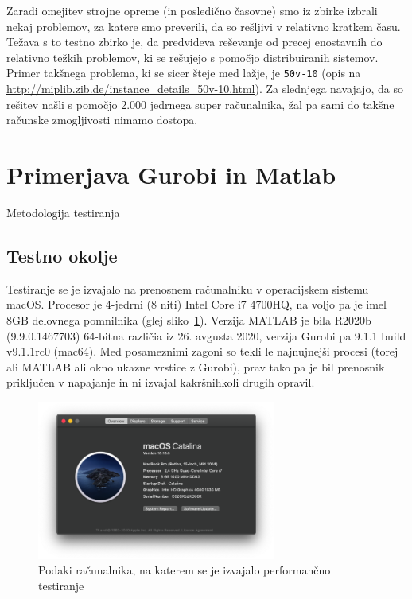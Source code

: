 \documentclass[a4paper,11pt]{article}
\begin{document}
Zaradi omejitev strojne opreme (in posledično časovne) smo iz zbirke izbrali nekaj problemov, za katere smo preverili, da so rešljivi v relativno kratkem času. Težava s to testno zbirko je, da predvideva reševanje od precej enostavnih do relativno težkih problemov, ki se rešujejo s pomočjo distribuiranih sistemov. Primer takšnega problema, ki se sicer šteje med lažje, je \texttt{50v-10} (opis na  \url{http://miplib.zib.de/instance_details_50v-10.html}). Za slednjega navajajo, da so rešitev našli s pomočjo 2.000 jedrnega super računalnika, žal pa sami do takšne računske zmogljivosti nimamo dostopa.

\section{Primerjava Gurobi in Matlab}
Metodologija testiranja

\subsection{Testno okolje}
Testiranje se je izvajalo na prenosnem računalniku v operacijskem sistemu macOS. Procesor je 4-jedrni (8 niti) Intel Core i7 4700HQ, na voljo pa je imel 8GB delovnega pomnilnika (glej sliko~\ref{img:davids_mbp}). Verzija MATLAB je bila R2020b (9.9.0.1467703) 64-bitna različia iz 26. avgusta 2020, verzija Gurobi pa 9.1.1 build v9.1.1rc0 (mac64). Med posameznimi zagoni so tekli le najnujnejši procesi (torej ali MATLAB ali okno ukazne vrstice z Gurobi), prav tako pa je bil prenosnik priključen v napajanje in ni izvajal kakršnihkoli drugih opravil.

\begin{figure}[htpb]
	\centering
	\includegraphics[width=0.7\textwidth]{images/davids-mbp.png}
	\caption{Podaki računalnika, na katerem se je izvajalo performančno testiranje}
	\label{img:davids_mbp}
\end{figure}
\end{document}
